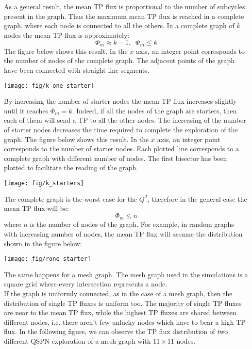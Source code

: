 \documentclass[a4paper]{article}
\begin{document}
As a general result, the mean TP flux is proportional to the number of
subcycles present in the graph. Thus the maximum mean TP flux is reached in a
complete graph, where each node is connected to all the others. In a complete
graph of $k$ nodes the mean TP flux is approximately:
\[
	\Phi_m \approx k-1,\;\; \Phi_m \le k
\]
The figure below shows this result. In the $x$ axis, an integer point
corresponds to the number of nodes of the complete graph. The adjacent points of the
graph have been connected  with straight line segments.
\begin{center}
\label{fig:k_one_starter}
\texttt{[image: fig/k\_one\_starter]}
\end{center}
By increasing the number of starter nodes the
mean TP flux increases slightly until it reaches $\Phi_m=k$. Indeed, if all the
nodes of the graph are starters, then each of them will send a TP to all the
other nodes. The increasing of the number of starter nodes decreases the time required
to complete the exploration of the graph.
The figure below shows this result. In the $x$ axis, an integer point
corresponds to the number of starter nodes. Each plotted line corresponds to a
complete graph with different number of nodes. The first bisector has been
plotted to facilitate the reading of the graph.
\begin{center}
\label{fig:k_starters}
\texttt{[image: fig/k\_starters]}
\end{center}
The complete graph is the worst case for the $Q^2$, therefore in the general case the mean TP flux will be:
\[ \Phi_m \le n \]
where $n$ is the number of nodes of the graph.
For example, in random graphs with increasing number of nodes, the mean TP
flux will assume the distribution shown in the figure below:
\begin{center}
\label{fig:rone_starter}
\texttt{[image: fig/rone\_starter]}
\end{center}
The same happens for a mesh graph. The mesh graph used in the simulations
is a square grid where every intersection represents a node.\\
If the graph is uniformly connected, as in the case of a mesh graph, then the
distribution of single TP fluxes is uniform too.
The majority of single TP fluxes are near to the mean TP
flux, while the highest TP fluxes are shared between different nodes, i.e.
there aren't few unlucky nodes which have to bear a high TP flux.
In the following figure, we can observe the TP flux distribution
of two different QSPN exploration of a mesh graph with $11\times11$ nodes.
\end{document}
